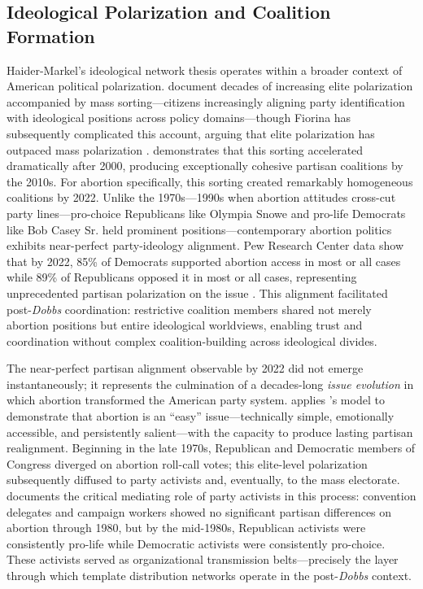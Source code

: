 \subsection{Ideological Polarization and Coalition Formation}
Haider-Markel's ideological network thesis operates within a broader context of American political polarization. \textcite{fiorinaPoliticalPolarizationAmerican2008a} document decades of increasing elite polarization accompanied by mass sorting—citizens increasingly aligning party identification with ideological positions across policy domains—though Fiorina has subsequently complicated this account, arguing that elite polarization has outpaced mass polarization \parencite{fiorinaCultureWar2011}.
\textcite{abramowitzDisappearingCenterEngaged2010a} demonstrates that this sorting accelerated dramatically after 2000, producing exceptionally cohesive partisan coalitions by the 2010s.
For abortion specifically, this sorting created remarkably homogeneous coalitions by 2022. Unlike the 1970s---1990s when abortion attitudes cross-cut party lines---pro-choice Republicans like Olympia Snowe and pro-life Democrats like Bob Casey Sr. held prominent positions---contemporary abortion politics exhibits near-perfect party-ideology alignment. Pew Research Center data show that by 2022, 85\% of Democrats supported abortion access in most or all cases while 89\% of Republicans opposed it in most or all cases, representing unprecedented partisan polarization on the issue \parencite{nadeemNearlyYearRoes2023a}. This alignment facilitated post-\emph{Dobbs} coordination: restrictive coalition members shared not merely abortion positions but entire ideological worldviews, enabling trust and coordination without complex coalition-building across ideological divides.

The near-perfect partisan alignment observable by 2022 did not emerge instantaneously; it represents the culmination of a decades-long \emph{issue evolution} in which abortion transformed the American party system. \textcite{fiorinaPoliticalPolarizationAmerican2008a} applies \textcite{CarminesStimson1989}'s model to demonstrate that abortion is an ``easy'' issue---technically simple, emotionally accessible, and persistently salient---with the capacity to produce lasting partisan realignment. Beginning in the late 1970s, Republican and Democratic members of Congress diverged on abortion roll-call votes; this elite-level polarization subsequently diffused to party activists and, eventually, to the mass electorate. \textcite{CarminesWoods2002} documents the critical mediating role of party activists in this process: convention delegates and campaign workers showed no significant partisan differences on abortion through 1980, but by the mid-1980s, Republican activists were consistently pro-life while Democratic activists were consistently pro-choice. These activists served as organizational transmission belts---precisely the layer through which template distribution networks operate in the post-\emph{Dobbs} context.


